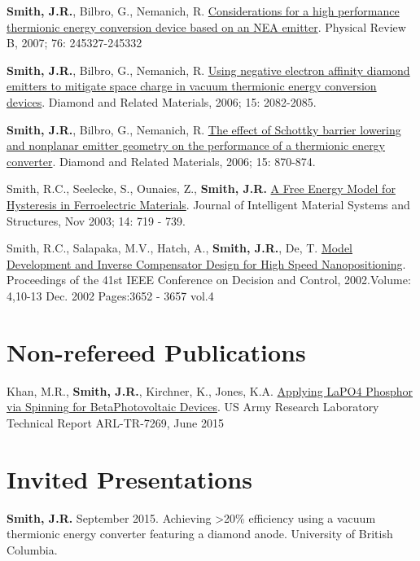 \textbf{Smith, J.R.}, Bilbro, G., Nemanich, R.
\href{http://dx.doi.org/10.1103/PhysRevB.76.245327}{Considerations for a
high performance thermionic energy conversion device based on an NEA
emitter}. Physical Review B, 2007; 76: 245327-245332

\textbf{Smith, J.R.}, Bilbro, G., Nemanich, R.
\href{http://dx.doi.org/10.1016/j.diamond.2006.09.011}{Using negative
electron affinity diamond emitters to mitigate space charge in vacuum
thermionic energy conversion devices}. Diamond and Related Materials,
2006; 15: 2082-2085.

\textbf{Smith, J.R.}, Bilbro, G., Nemanich, R.
\href{http://dx.doi.org/10.1016/j.diamond.2005.12.057}{The effect of
Schottky barrier lowering and nonplanar emitter geometry on the
performance of a thermionic energy converter}. Diamond and Related
Materials, 2006; 15: 870-874.

Smith, R.C., Seelecke, S., Ounaies, Z., \textbf{Smith, J.R.}
\href{http://dx.doi.org/10.1177/1045389X03038841}{A Free Energy Model
for Hysteresis in Ferroelectric Materials}. Journal of Intelligent
Material Systems and Structures, Nov 2003; 14: 719 - 739.

Smith, R.C., Salapaka, M.V., Hatch, A., \textbf{Smith, J.R.}, De, T.
\href{http://dx.doi.org/10.1109/CDC.2002.1184930}{Model Development and
Inverse Compensator Design for High Speed Nanopositioning}. Proceedings
of the 41st IEEE Conference on Decision and Control, 2002.Volume:
4,10-13 Dec. 2002 Pages:3652 - 3657 vol.4

\section{Non-refereed Publications}\label{non-refereed-publications}

Khan, M.R., \textbf{Smith, J.R.}, Kirchner, K., Jones, K.A.
\href{http://www.dtic.mil/docs/citations/ADA621659}{Applying LaPO4
Phosphor via Spinning for BetaPhotovoltaic Devices}. US Army Research
Laboratory Technical Report ARL-TR-7269, June 2015

\section{Invited Presentations}\label{invited-presentations}

\textbf{Smith, J.R.} September 2015. Achieving \textgreater{}20\%
efficiency using a vacuum thermionic energy converter featuring a
diamond anode. University of British Columbia.

